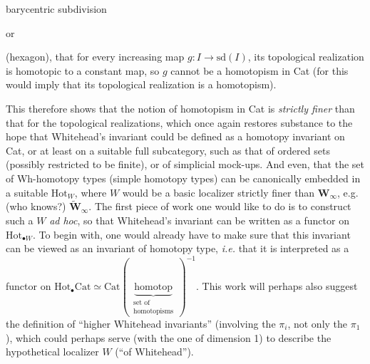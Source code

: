 \documentclass[11pt]{article}
\newcommand{\printedpage}[1]{\marginpar{\footnotesize p.~#1}}
\newcommand{\msp}[1]{\marginpar{\footnotesize [#1]}}
\begin{document}
barycentric subdivision
\printedpage{48}

\begin{center}
\qquad\qquad\qquad or \qquad\qquad\qquad
{}
\end{center}

(hexagon), that for every increasing map $g : I \longrightarrow \mathrm{sd}(I)$, its topological realization is homotopic to a constant map, so $g$ cannot be a homotopism in Cat (for this would imply that its topological realization is a homotopism).

This therefore shows that the notion of homotopism in Cat is \textit{strictly finer} than that for the topological realizations, which once again restores substance to the hope that Whitehead's invariant could be defined as a homotopy invariant on Cat, or at least on a suitable full subcategory, such as that of ordered sets (possibly restricted to be finite), or of simplicial mock-ups. And even, that the set of Wh-homotopy types (simple homotopy types) can be
\msp{page 96}
canonically embedded in a suitable $\mathrm{Hot}_W$, where $W$ would be a basic localizer strictly finer than $\mathbf{W}_\infty$, e.g. (who knows?) $\tilde{\mathbf{W}}_\infty$. The first piece of work one would like to do is to construct such a $W$ \textit{ad hoc}, so that Whitehead's invariant can be written as a functor on $\mathrm{Hot}_{\bullet W}$. To begin with, one would already have to make sure that this invariant can be viewed as an invariant of homotopy type, \textit{i.e.} that it is interpreted as a functor on $\mathrm{Hot}_{\bullet}\mathrm{Cat} \simeq \mathrm{Cat}(\,\underbrace{\text{homotop}}_{\substack{\text{set of}\\ \text{homotopisms}}}\,)^{-1}$. This work will perhaps also suggest the definition of ``higher Whitehead invariants'' (involving the $\pi_i$, not only the $\pi_1$), which could perhaps serve (with the one of dimension 1) to describe the hypothetical localizer $W$ (``of Whitehead'').
\end{document}
